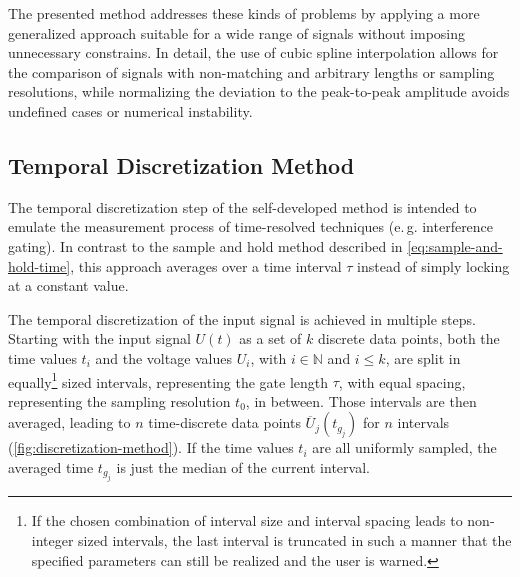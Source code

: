 The presented method addresses these kinds of problems by applying a more generalized approach suitable for a wide range of signals without imposing unnecessary constrains. In detail, the use of cubic spline interpolation allows for the comparison of signals with non-matching and arbitrary lengths or sampling resolutions, while normalizing the deviation to the peak-to-peak amplitude avoids undefined cases or numerical instability. 
\subsection{Temporal Discretization Method} \label{ssec:discretization-method}
The temporal discretization step of the self-developed method is intended to emulate the measurement process of time-resolved techniques (e.\,g. interference gating). In contrast to the sample and hold method described in \cref{eq:sample-and-hold-time}, this approach averages over a time interval $\tau$ instead of simply locking at a constant value.

The temporal discretization of the input signal is achieved in multiple steps. Starting with the input signal $U\left(t\right)$ as a set of $k$ discrete data points, both the time values $t_i$ and the voltage values $U_i$, with $i \in \mathbb{N}$ and $i \leq k$, are split in equally\footnote{If the chosen combination of interval size and interval spacing leads to non-integer sized intervals, the last interval is truncated in such a manner that the specified parameters can still be realized and the user is warned.} sized intervals, representing the gate length $\tau$, with equal spacing, representing the sampling resolution $t_0$, in between. Those intervals are then averaged, leading to $n$ time-discrete data points $\overline{U}_j\left(t_{g_j}\right)$ for $n$ intervals (\cref{fig:discretization-method}). If the time values $t_i$ are all uniformly sampled, the averaged time $t_{g_j}$ is just the median of the current interval.

